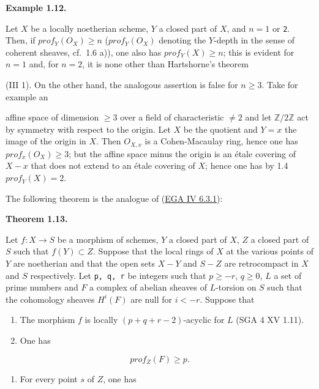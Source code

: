 \documentclass[
  11pt,
  a4paper,
]{book}
\newcounter{none} %
\providecommand{\tightlist}{%
  \setlength{\itemsep}{0pt}\setlength{\parskip}{0pt}}
\begin{document}
\textbf{Example 1.12.}

Let \(X\) be a locally noetherian scheme, \(Y\) a closed part of \(X\),
and \(n = 1\) or \texttt{2}. Then, if \(prof_{Y}(O_{X})
\geqslant n\) (\(prof_{Y}(O_{X})\) denoting the \(Y\)-depth in the sense
of coherent sheaves, cf.~1.6 a)), one also has
\(prof_{Y}(X) \geqslant n\); this is evident for \(n = 1\) and, for
\(n = 2\), it is none other than Hartshorne's theorem

(III 1). On the other hand, the analogous assertion is false for
\(n \geqslant 3\). Take for example an

affine space of dimension \(\geqslant 3\) over a field of characteristic
\(\neq 2\) and let \(\mathbb{Z}/2\mathbb{Z}\) act by symmetry with
respect to the origin. Let \(X\) be the quotient and \(Y = {x}\) the
image of the origin in \(X\). Then \(O_{X,x}\) is a Cohen-Macaulay ring,
hence one has \(prof_{x}(O_{X}) \geqslant 3\); but the affine space
minus the origin is an étale covering of \(X - {x}\) that does not
extend to an étale covering of \(X\); hence one has by 1.4
\(prof_{Y}(X) =
2\).

The following theorem is the analogue of
(\href{https://jcreinhold.github.io/ega/iv/18-ch4-06-flat-morphisms.html\#63-flatness-and-depth}{EGA
IV 6.3.1}):

\textbf{Theorem 1.13.}

Let \(f : X \to S\) be a morphism of schemes, \(Y\) a closed part of
\(X\), \(Z\) a closed part of \(S\) such that \(f(Y) \subset
Z\). Suppose that the local rings of \(X\) at the various points of
\(Y\) are noetherian and that the open sets \(X - Y\) and \(S - Z\) are
retrocompact in \(X\) and \(S\) respectively. Let \texttt{p,\ q,\ r} be
integers such that \(p \geqslant -r\), \(q \geqslant
0\), \(L\) a set of prime numbers and \(F\) a complex of abelian sheaves
of \(L\)-torsion on \(S\) such that the cohomology sheaves \(H^{i}(F)\)
are null for \(i < -r\). Suppose that

\begin{enumerate}
\def\labelenumi{\alph{enumi})}
\item
  The morphism \(f\) is locally \((p + q + r - 2)\)-acyclic for \(L\)
  (SGA 4 XV 1.11).
\item
  One has
\end{enumerate}

\[ prof_{Z}(F) \geqslant p. \]

\begin{enumerate}
\def\labelenumi{\alph{enumi})}
\setcounter{enumi}{2}
\tightlist
\item
  For every point \(s\) of \(Z\), one has
\end{enumerate}
\end{document}

